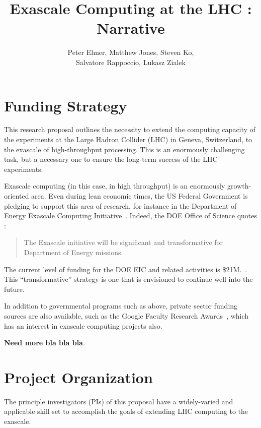 \documentclass[12pt]{article}
\begin{document}
\title{Exascale Computing at the LHC : Narrative}
\author{Peter Elmer, Matthew Jones, Steven Ko,\\ Salvatore Rappoccio, Lukasz Zialek}

\maketitle

\clearpage

\section{Funding Strategy}

This research proposal outlines the necessity to extend the computing
capacity of the experiments at the Large Hadron Collider (LHC) in
Geneva, Switzerland, to the exascale of high-throughput
processing. This is an enormously challenging task, but a necessary
one to ensure the long-term success of the LHC experiments. 

Exascale computing (in this case, in high throughput)
is an enormously growth-oriented area. Even during
lean economic times, the US Federal Government is pledging to support
this area of research, for instance in the Department of Energy
Exascale Computing Initiative~\cite{doe_eci}. Indeed, the DOE Office of
Science quotes :
\begin{quote}
The Exascale initiative will be significant and transformative for Department of Energy missions.
\end{quote}
The current level of funding for the DOE EIC and related activities is
\$21M.~\cite{doe_eci_budget}. This ``transformative'' strategy is one
that is envisioned to continue well into the future. 

In addition to governmental programs such as above, private sector
funding sources are also available, such as the Google Faculty
Research Awards~\cite{google_fac_awards}, which has an interest in
exascale computing projects also. 



\bigskip

{\bf Need more bla bla bla}. 

\clearpage

\section{Project Organization}

The principle investigators (PIs) of this proposal have a
widely-varied and applicable skill set to accomplish the goals of
extending LHC computing to the exascale. 
\end{document}
